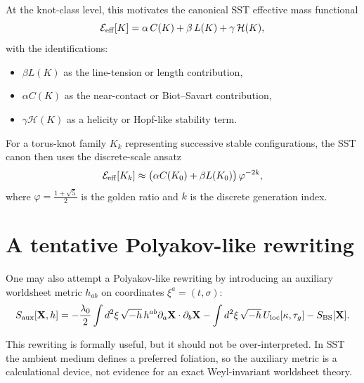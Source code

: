 \documentclass[12pt,a4paper]{article}
\begin{document}
        At the knot-class level, this motivates the canonical SST effective mass functional
        \begin{equation}
            \mathcal{E}_{\rm eff}[K] = \alpha\,C(K) + \beta\,L(K) + \gamma\,\mathcal{H}(K),
        \end{equation}
        with the identifications:
        \begin{itemize}
            \item \(\beta L(K)\) as the line-tension or length contribution,
            \item \(\alpha C(K)\) as the near-contact or Biot--Savart contribution,
            \item \(\gamma \mathcal{H}(K)\) as a helicity or Hopf-like stability term.
        \end{itemize}
        
        For a torus-knot family \(K_k\) representing successive stable configurations, the SST canon then uses the discrete-scale ansatz
        \begin{equation}
            \mathcal{E}_{\rm eff}[K_k]
            \approx
            \bigl(\alpha C(K_0)+\beta L(K_0)\bigr)\,\varphi^{-2k},
        \end{equation}
        where \(\varphi=\frac{1+\sqrt{5}}{2}\) is the golden ratio and \(k\) is the discrete generation index.
    
    \section{A tentative Polyakov-like rewriting}
        
        One may also attempt a Polyakov-like rewriting by introducing an auxiliary worldsheet metric \(h_{ab}\) on coordinates \(\xi^a=(t,\sigma)\):
        \begin{equation}
            S_{\rm aux}[\mathbf{X},h]
            =
            -\frac{\lambda_0}{2}
            \int d^2\xi\,\sqrt{-h}\,h^{ab}
            \partial_a \mathbf{X}\cdot \partial_b \mathbf{X}
            -\int d^2\xi\,\sqrt{-h}\,U_{\rm loc}[\kappa,\tau_g]
            -S_{\rm BS}[\mathbf{X}].
            \label{eq:AuxAction}
        \end{equation}
        
        This rewriting is formally useful, but it should not be over-interpreted. In SST the ambient medium defines a preferred foliation, so the auxiliary metric is a calculational device, not evidence for an exact Weyl-invariant worldsheet theory.
    
\end{document}
